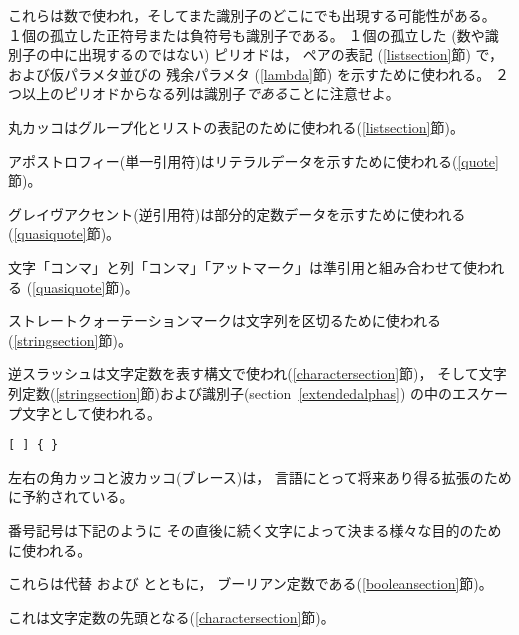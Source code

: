 \begin{description}{}{}

\item[{\tt.\ + -}]
これらは数で使われ，そしてまた識別子のどこにでも出現する可能性がある。
１個の孤立した正符号または負符号も識別子である。
１個の孤立した (数や識別子の中に出現するのではない) ピリオドは，
ペアの表記 (\ref{listsection}節) で，および仮パラメタ並びの
残余パラメタ (\ref{lambda}節) を示すために使われる。
２つ以上のピリオドからなる列は識別子{\em である}ことに注意せよ。

\item[\tt( )]
丸カッコはグループ化とリストの表記のために使われる(\ref{listsection}節)。

\item[\singlequote]
アポストロフィー(単一引用符)はリテラルデータを示すために使われる(\ref{quote}節)。

\item[\backquote]
グレイヴアクセント(逆引用符)は部分的定数データを示すために使われる(\ref{quasiquote}節)。

\item[\tt, ,@]
文字「コンマ」と列「コンマ」「アットマーク」は準引用と組み合わせて使われる
(\ref{quasiquote}節)。

\item[\tt"]
ストレートクォーテーションマークは文字列を区切るために使われる(\ref{stringsection}節)。

\item[\backwhack]
逆スラッシュは文字定数を表す構文で使われ(\ref{charactersection}節)，
そして文字列定数(\ref{stringsection}節)および識別子(section~\ref{extendedalphas})
の中のエスケープ文字として使われる。

\hbox{\tt \verb"[" \verb"]" \verb"{" \verb"}"}
\item[\copy0]
左右の角カッコと波カッコ(ブレース)は，
言語にとって将来あり得る拡張のために予約されている。

\item[\sharpsign] 番号記号は下記のように
その直後に続く文字によって決まる様々な目的のために使われる。

\item[\schtrue{} \schfalse{}]
これらは代替  および  とともに，
ブーリアン定数である(\ref{booleansection}節)。

\item[\sharpsign\backwhack]
これは文字定数の先頭となる(\ref{charactersection}節)。


\end{description}

